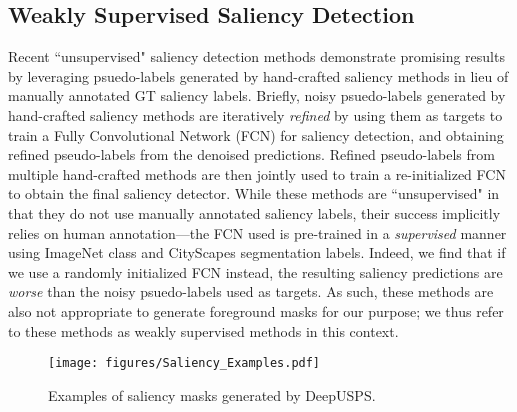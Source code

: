 \documentclass[twoside,11pt]{article}
\begin{document}
\subsection{Weakly Supervised Saliency Detection} 
Recent ``unsupervised" saliency detection methods \citep{nguyen_deepusps_2019, zhang_deep_2018, zhang_supervision_2017} demonstrate promising results by leveraging psuedo-labels generated by hand-crafted saliency methods in lieu of manually annotated GT saliency labels. Briefly, noisy psuedo-labels generated by hand-crafted saliency methods are iteratively \textit{refined} by using them as targets to train a Fully Convolutional Network (FCN) for saliency detection, and obtaining refined pseudo-labels from the denoised predictions. Refined pseudo-labels from multiple hand-crafted methods are then jointly used to train a re-initialized FCN to obtain the final saliency detector. While these methods are ``unsupervised" in that they do not use manually annotated saliency labels, their success implicitly relies on human annotation---the FCN used is pre-trained in a \textit{supervised} manner using ImageNet class and CityScapes \citep{cordts_cityscapes_2016} segmentation labels. Indeed, we find that if we use a randomly initialized FCN instead, the resulting saliency predictions are \textit{worse} than the noisy psuedo-labels used as targets. As such, these methods are also not appropriate to generate foreground masks for our purpose; we thus refer to these methods as weakly supervised methods in this context.

\begin{figure}
    \centering
    \texttt{[image: figures/Saliency\_Examples.pdf]}
    \caption{ Examples of saliency masks generated by DeepUSPS.}
    \label{fig:saliency_examples}
\end{figure}
\end{document}
